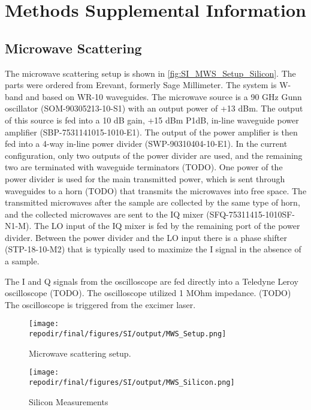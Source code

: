 \section{Methods Supplemental Information}

\subsection{Microwave Scattering}

The microwave scattering setup is shown in \ref{fig:SI_MWS_Setup_Silicon}. The parts were ordered from Erevant, formerly Sage Millimeter. The system is W-band and based on WR-10 waveguides. The microwave source is a 90 GHz Gunn oscillator (SOM-90305213-10-S1) with an output power of +13 dBm. The output of this source is fed into a 10 dB gain, +15 dBm P1dB, in-line waveguide power amplifier (SBP-7531141015-1010-E1). The output of the power amplifier is then fed into a 4-way in-line power divider (SWP-90310404-10-E1). In the current configuration, only two outputs of the power divider are used, and the remaining two are terminated with waveguide terminators (TODO). One power of the power divider is used for the main transmitted power, which is sent through waveguides to a horn (TODO) that transmits the microwaves into free space. The transmitted microwaves after the sample are collected by the same type of horn, and the collected microwaves are sent to the IQ mixer (SFQ-75311415-1010SF-N1-M). The LO input of the IQ mixer is fed by the remaining port of the power divider. Between the power divider and the LO input there is a phase shifter (STP-18-10-M2) that is typically used to maximize the I signal in the absence of a sample. 

The I and Q signals from the oscilloscope are fed directly into a Teledyne Leroy oscilloscope (TODO). The oscilloscope utilized 1 MOhm impedance. (TODO) The oscilloscope is triggered from the excimer laser. 

\begin{figure}[]
\centering
\texttt{[image: \\repodir/final/figures/SI/output/MWS\_Setup.png]}
\caption{Microwave scattering setup.}
\label{fig:SI_MWS_Setup}
\end{figure}

\begin{figure}[]
\centering
\texttt{[image: \\repodir/final/figures/SI/output/MWS\_Silicon.png]}
\caption{Silicon Measurements}
\label{fig:SI_MWS_Silicon}
\end{figure}

